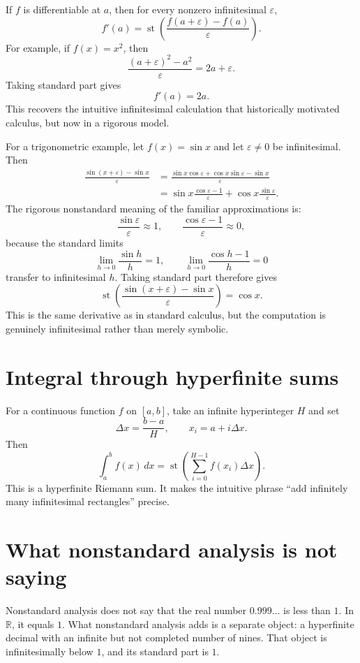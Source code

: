 If $f$ is differentiable at $a$, then for every nonzero infinitesimal $\varepsilon$,
\[
  f'(a)=\operatorname{st}\left(
  \frac{f(a+\varepsilon)-f(a)}{\varepsilon}
  \right).
\]
For example, if $f(x)=x^2$, then
\[
  \frac{(a+\varepsilon)^2-a^2}{\varepsilon}=2a+\varepsilon.
\]
Taking standard part gives
\[
  f'(a)=2a.
\]
This recovers the intuitive infinitesimal calculation that historically motivated calculus, but now in a rigorous model.

For a trigonometric example, let \(f(x)=\sin x\) and let \(\varepsilon\ne0\) be infinitesimal.  Then
\[
\begin{aligned}
  \frac{\sin(x+\varepsilon)-\sin x}{\varepsilon}
  &=
  \frac{\sin x\cos\varepsilon+\cos x\sin\varepsilon-\sin x}{\varepsilon}\\
  &=
  \sin x\frac{\cos\varepsilon-1}{\varepsilon}
  +
  \cos x\frac{\sin\varepsilon}{\varepsilon}.
\end{aligned}
\]
The rigorous nonstandard meaning of the familiar approximations is:
\[
  \frac{\sin\varepsilon}{\varepsilon}\approx1,
  \qquad
  \frac{\cos\varepsilon-1}{\varepsilon}\approx0,
\]
because the standard limits
\[
  \lim_{h\to0}\frac{\sin h}{h}=1,
  \qquad
  \lim_{h\to0}\frac{\cos h-1}{h}=0
\]
transfer to infinitesimal \(h\).  Taking standard part therefore gives
\[
  \operatorname{st}\left(
  \frac{\sin(x+\varepsilon)-\sin x}{\varepsilon}
  \right)
  =
  \cos x.
\]
This is the same derivative as in standard calculus, but the computation is genuinely infinitesimal rather than merely symbolic.

\section{Integral through hyperfinite sums}

For a continuous function $f$ on $[a,b]$, take an infinite hyperinteger $H$ and set
\[
  \Delta x=\frac{b-a}{H},
  \qquad
  x_i=a+i\Delta x.
\]
Then
\[
  \int_a^b f(x)\,dx
  =\operatorname{st}\left(\sum_{i=0}^{H-1}f(x_i)\Delta x\right).
\]
This is a hyperfinite Riemann sum.  It makes the intuitive phrase “add infinitely many infinitesimal rectangles” precise.

\section{What nonstandard analysis is not saying}

Nonstandard analysis does not say that the real number $0.999\ldots$ is less than $1$.  In $\mathbb R$, it equals $1$.  What nonstandard analysis adds is a separate object: a hyperfinite decimal with an infinite but not completed number of nines.  That object is infinitesimally below $1$, and its standard part is $1$.

